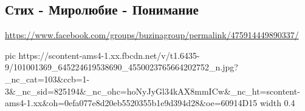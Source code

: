  
 
 
 
 

\subsection{Стих - Миролюбие - Понимание}
\label{sec:20_06_2020.fb.buzinagroup.1.stih_mova_jazyk}
\url{https://www.facebook.com/groups/buzinagroup/permalink/475914449890337/}

\ifcmt
  pic https://scontent-ams4-1.xx.fbcdn.net/v/t1.6435-9/101001369_645224619538690_4550023765664202752_n.jpg?_nc_cat=103&ccb=1-3&_nc_sid=825194&_nc_ohc=hoNyJyGl34kAX8mmICw&_nc_ht=scontent-ams4-1.xx&oh=0efa077e8d20eb5520355b1e9d394d28&oe=60914D15
  width 0.4
\fi

